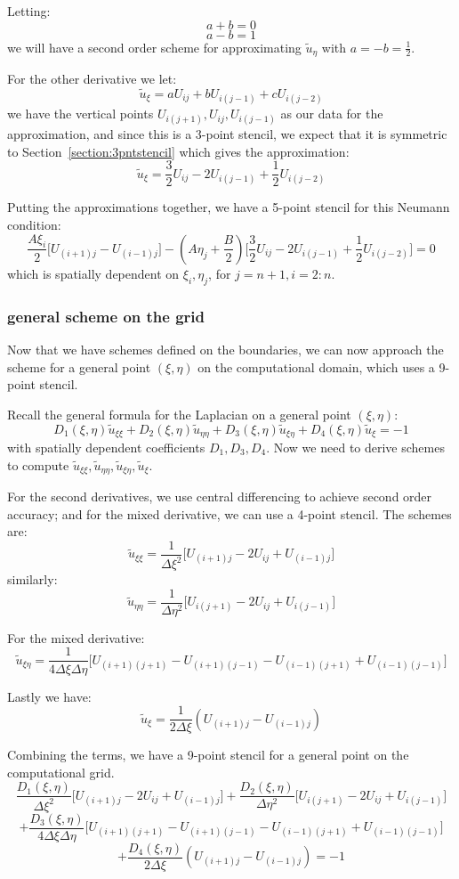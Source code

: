 \documentclass[12pt]{article}
\begin{document}
Letting:
$$
	a + b = 0
$$
$$
	a - b = 1
$$ we will have a second order scheme for approximating $\tilde{u}_{\eta}$ with $a=-b=\frac12$.

For the other derivative we let:
$$
	\tilde{u}_{\xi} = aU_{ij} + bU_{i(j-1)} + cU_{i(j-2)}
$$ we have the vertical points $U_{i(j+1)}, U_{ij}, U_{i(j-1)}$ as our data for the approximation, and since this is a 3-point stencil, we expect that it is symmetric to Section~\ref{section:3pntstencil} which gives the approximation:
$$
	\tilde{u}_{\xi} = \frac{3}{2}U_{ij} - 2U_{i(j-1)} + \frac12 U_{i(j-2)}
$$

Putting the approximations together, we have a 5-point stencil for this Neumann condition:
$$
	\frac{A\xi_{i}}{2}\big[ U_{(i+1)j} - U_{(i-1)j}\big] - (A\eta_{j}+\frac{B}{2})\big[ \frac32 U_{ij} - 2 U_{i(j-1)} + \frac12 U_{i(j-2)}\big] = 0
$$ which is spatially dependent on $\xi_{i},\eta_{j}$, for $j=n+1,i=2:n$.


\subsubsection{general scheme on the grid}
Now that we have schemes defined on the boundaries, we can now approach the scheme for a general point $(\xi,\eta)$ on the computational domain, which uses a 9-point stencil.

Recall the general formula for the Laplacian on a general point $(\xi,\eta)$:
$$
	D_1(\xi,\eta)\tilde{u}_{\xi\xi} + D_2(\xi,\eta)\tilde{u}_{\eta\eta} + D_3(\xi,\eta)\tilde{u}_{\xi\eta}+D_4(\xi,\eta)\tilde{u}_{\xi} = -1
$$ with spatially dependent coefficients $D_1,D_3,D_4$. Now we need to derive schemes to compute $\tilde{u}_{\xi\xi}, \tilde{u}_{\eta\eta}, \tilde{u}_{\xi\eta}, \tilde{u}_{\xi}$.

For the second derivatives, we use central differencing to achieve second order accuracy; and for the mixed derivative, we can use a 4-point stencil. The schemes are:
$$
	\tilde{u}_{\xi\xi} = \frac{1}{\Delta\xi^2}\big[U_{(i+1)j} - 2U_{ij} + U_{(i-1)j}\big]
$$ similarly:
$$
	\tilde{u}_{\eta\eta} = \frac{1}{\Delta\eta^2}\big[U_{i(j+1)} - 2U_{ij} + U_{i(j-1)}\big]
$$

For the mixed derivative:
$$
	\tilde{u}_{\xi\eta} = \frac{1}{4\Delta\xi\Delta\eta} 
	\big[
		U_{(i+1)(j+1)} - U_{(i+1)(j-1)} - U_{(i-1)(j+1)} + U_{(i-1)(j-1)}
	\big]
$$

Lastly we have:
$$
	\tilde{u}_{\xi} = \frac{1}{2\Delta\xi}(U_{(i+1)j} - U_{(i-1)j})
$$

	Combining the terms, we have a 9-point stencil for a general point on the computational grid.
$$
	\frac{D_1(\xi,\eta)}{\Delta\xi^2}\big[U_{(i+1)j} - 2U_{ij} + U_{(i-1)j}\big] + 
	\frac{D_2(\xi,\eta)}{\Delta\eta^2}\big[U_{i(j+1)} - 2U_{ij} + U_{i(j-1)}\big] 
$$
$$
+ 
	\frac{D_3(\xi,\eta)}{4\Delta\xi\Delta\eta} 
	\big[
		U_{(i+1)(j+1)} - U_{(i+1)(j-1)} - U_{(i-1)(j+1)} + U_{(i-1)(j-1)}
	\big] 
$$
$$
	+ 
	\frac{D_4(\xi,\eta)}{2\Delta\xi}(U_{(i+1)j} - U_{(i-1)j})
	= -1
$$
\end{document}
